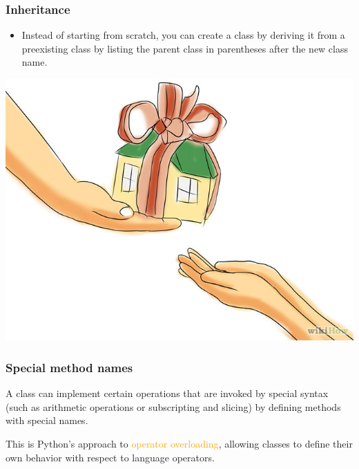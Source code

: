 \documentclass{../py-lecture}
\begin{document}
\begin{frame}
	\frametitle{Inheritance}
  \begin{itemize}
    \item Instead of starting from scratch, you can create a class by deriving it
    from a preexisting class by listing the parent class in parentheses
    after the new class name.
  \end{itemize}
	\centering \includegraphics[width=.4\textwidth]{img/inheritance.jpg}
\end{frame}


\begin{frame}
	\frametitle{Special method names}
  \par
  A class can implement certain operations that are invoked by special syntax (such as arithmetic operations or subscripting and slicing) by defining methods with special names.
  \par
  This is Python’s approach to \textcolor{Orange}{operator overloading}, allowing classes to define their own behavior with respect to language operators.
\end{frame}
\end{document}
